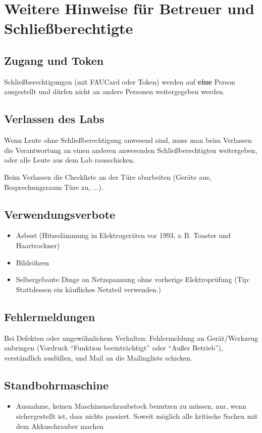 \documentclass[13pt]{\basedir/fablab-document}
\begin{document}
\newpage
\section{Weitere Hinweise für Betreuer und Schließberechtigte}
\subsection{Zugang und Token}
Schließberechtigungen (mit FAUCard oder Token) werden auf \textbf{eine} Person ausgestellt und dürfen nicht an andere Personen weitergegeben werden.

\subsection{Verlassen des Labs}
Wenn Leute ohne Schließberechtigung anwesend sind, muss man beim Verlassen die Verantwortung an einen anderen anwesenden Schließberechtigten weitergeben, oder alle Leute aus dem Lab rausschicken.

Beim Verlassen die Checkliste an der Türe abarbeiten (Geräte aus, Besprechungsraum Türe zu, ...).

\subsection{Verwendungsverbote}
\begin{itemize}
	\item Asbest (Hitzedämmung in Elektrogeräten vor 1993, z.\,B. Toaster und Haartrockner)
	\item Bildröhren
	\item Selbergebaute Dinge an Netzspannung ohne vorherige Elektroprüfung (Tip: Stattdessen ein käufliches Netzteil verwenden.)
\end{itemize}

\subsection{Fehlermeldungen}
Bei Defekten oder ungewöhnlichem Verhalten: Fehlermeldung an Gerät/Werkzeug anbringen (Vordruck \enquote{Funktion beeinträchtigt} oder \enquote{Außer Betrieb}), verständlich ausfüllen, und Mail an die Mailingliste schicken.

\subsection{Standbohrmaschine}
\begin{itemize}
	\item Ausnahme, keinen Maschinenschraubstock benutzen zu müssen, nur, wenn sichergestellt ist, dass nichts passiert. Soweit möglich alle kritische Sachen mit dem Akkuschrauber machen
\end{itemize}

\end{document}
